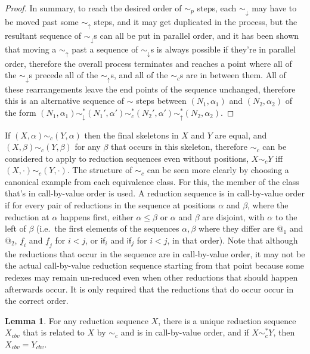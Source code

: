 \documentclass{article}
\theoremstyle{definition}
\theoremstyle{lemma}
\newtheorem{lemma}{Lemma}
\theoremstyle{remark}
\begin{document}
\begin{proof}
  In summary, to reach the desired order of $\sim_p$ steps, each $\sim_\downarrow$ may have to be moved past some $\sim_\uparrow$ steps, and it may get duplicated in the process, but the resultant sequence of $\sim_\downarrow$s can all be put in parallel order, and it has been shown that moving a $\sim_\uparrow$ past a sequence of $\sim_\downarrow$s is always possible if they're in parallel order, therefore the overall process terminates and reaches a point where all of the $\sim_\downarrow$s precede all of the $\sim_\uparrow$s, and all of the $\sim_c$s are in between them. All of these rearrangements leave the end points of the sequence unchanged, therefore this is an alternative sequence of $\sim$ steps between $(N_1,\alpha_1)$ and $(N_2,\alpha_2)$ of the form $(N_1,\alpha_1) \sim_\downarrow^* (N_1', \alpha') \sim_c^* (N_2', \alpha') \sim_\uparrow^* (N_2,\alpha_2)$.
\end{proof}


If $(X,\alpha) \sim_c (Y,\alpha)$ then the final skeletons in $X$ and $Y$ are equal, and $(X,\beta) \sim_c (Y,\beta)$ for any $\beta$ that occurs in this skeleton, therefore $\sim_c$ can be considered to apply to reduction sequences even without positions, $X \sim_c Y$ iff $(X,\cdot) \sim_c (Y,\cdot)$. The structure of $\sim_c$ can be seen more clearly by choosing a canonical example from each equivalence class. For this, the member of the class that's in call-by-value order is used. A reduction sequence is in call-by-value order if for every pair of reductions in the sequence at positions $\alpha$ and $\beta$, where the reduction at $\alpha$ happens first, either $\alpha \leq \beta$ or $\alpha$ and $\beta$ are disjoint, with $\alpha$ to the left of $\beta$ (i.e.~the first elements of the sequences $\alpha, \beta$ where they differ are $@_1$ and $@_2$, $\underline f_i$ and $\underline f_j$ for $i < j$, or $\textsf{if}_i$ and $\textsf{if}_j$ for $i < j$, in that order). Note that although the reductions that occur in the sequence are in call-by-value order, it may not be the actual call-by-value reduction sequence starting from that point because some redexes may remain un-reduced even when other reductions that should happen afterwards occur. It is only required that the reductions that do occur occur in the correct order.

\begin{lemma} \label{canonicalCousins}
For any reduction sequence $X$, there is a unique reduction sequence $X_{cbv}$ that is related to $X$ by $\sim_c$ and is in call-by-value order, and if $X \sim_c^* Y$, then $X_{cbv} = Y_{cbv}$.
\end{lemma}
\end{document}
